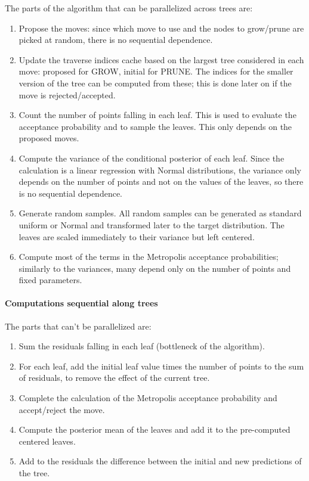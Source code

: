 \documentclass{article}
\begin{document}
    The parts of the algorithm that can be parallelized across trees are:
    \begin{enumerate}
        \item Propose the moves: since which move to use and the nodes to grow/prune are picked at random, there is no sequential dependence.
        
        \item Update the traverse indices cache based on the largest tree considered in each move: proposed for GROW, initial for PRUNE. The indices for the smaller version of the tree can be computed from these; this is done later on if the move is rejected/accepted.
        
        \item Count the number of points falling in each leaf. This is used to evaluate the acceptance probability and to sample the leaves. This only depends on the proposed moves.
        
        \item Compute the variance of the conditional posterior of each leaf. Since the calculation is a linear regression with Normal distributions, the variance only depends on the number of points and not on the values of the leaves, so there is no sequential dependence.
        
        \item Generate random samples. All random samples can be generated as standard uniform or Normal and transformed later to the target distribution. The leaves are  scaled immediately to their variance but left centered.
        
        \item Compute most of the terms in the Metropolis acceptance probabilities; similarly to the variances, many depend only on the number of points and fixed parameters.
    \end{enumerate}

    \paragraph{Computations sequential along trees}

    The parts that can't be parallelized are:
    \begin{enumerate}[start=7]
        \item Sum the residuals falling in each leaf (bottleneck of the algorithm).

        \item For each leaf, add the initial leaf value times the number of points to the sum of residuals, to remove the effect of the current tree.

        \item Complete the calculation of the Metropolis acceptance probability and accept/reject the move.

        \item Compute the posterior mean of the leaves and add it to the pre-computed centered leaves.

        \item Add to the residuals the difference between the initial and new predictions of the tree.
    \end{enumerate}
\end{document}
